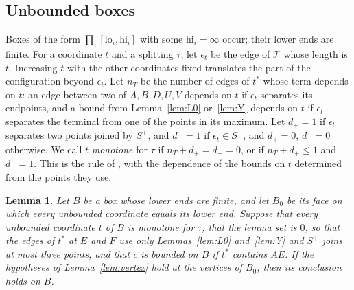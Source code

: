 \documentclass[11pt]{amsart}
\newtheorem{lemma}[theorem]{Lemma}
\theoremstyle{definition}
\theoremstyle{remark}
\numberwithin{equation}{section}
\begin{document}
\subsection{Unbounded boxes}
Boxes of the form $\prod_i[\mathrm{lo}_i,\mathrm{hi}_i]$ with some $\mathrm{hi}_i=\infty$ occur; their lower ends are finite. For a coordinate $t$ and a splitting $\tau$, let $\epsilon_t$ be the edge of $\mathcal T$ whose length is $t$. Increasing $t$ with the other coordinates fixed translates the part of the configuration beyond $\epsilon_t$. Let $n_T$ be the number of edges of $t^*$ whose term depends on $t$: an edge between two of $A,B,D,U,V$ depends on $t$ if $\epsilon_t$ separates its endpoints, and a bound from Lemma~\ref{lem:L0} or~\ref{lem:Y} depends on $t$ if $\epsilon_t$ separates the terminal from one of the points in its maximum. Let $d_+=1$ if $\epsilon_t$ separates two points joined by $S^+$, and $d_-=1$ if $\epsilon_t\in S^-$, and $d_+=0$, $d_-=0$ otherwise. We call $t$ \emph{monotone} for $\tau$ if $n_T+d_+=d_-=0$, or if $n_T+d_+\le1$ and $d_-=1$. This is the rule of \cite[Algorithm~2 and Proposition~37]{KHSHGW}, with the dependence of the bounds on $t$ determined from the points they use.

\begin{lemma}\label{lem:unbounded}
Let $B$ be a box whose lower ends are finite, and let $B_0$ be its face on which every unbounded coordinate equals its lower end. Suppose that every unbounded coordinate $t$ of $B$ is monotone for $\tau$, that the lemma set is $0$, so that the edges of $t^*$ at $E$ and $F$ use only Lemmas~\ref{lem:L0} and~\ref{lem:Y} and $S^+$ joins at most three points, and that $c$ is bounded on $B$ if $t^*$ contains $AE$. If the hypotheses of Lemma~\ref{lem:vertex} hold at the vertices of $B_0$, then its conclusion holds on $B$.
\end{lemma}
\end{document}
